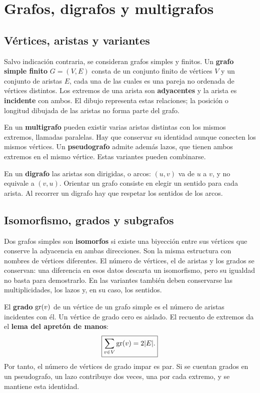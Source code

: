 \chapter{Grafos, digrafos y multigrafos}
\label{md:grafos}

\section{Vértices, aristas y variantes}

Salvo indicación contraria, se consideran grafos simples y finitos.
Un \textbf{grafo simple finito} $G=(V,E)$ consta de un conjunto finito
de vértices $V$ y un conjunto de aristas $E$, cada una de las cuales
es una pareja no ordenada de vértices distintos.
Los extremos de una arista son \textbf{adyacentes} y la arista es
\textbf{incidente} con ambos. El dibujo representa estas relaciones;
la posición o longitud dibujada de las aristas no forma parte del grafo.

En un \textbf{multigrafo} pueden existir varias aristas distintas
con los mismos extremos, llamadas paralelas. Hay que conservar
su identidad aunque conecten los mismos vértices.
Un \textbf{pseudografo} admite además lazos, que tienen ambos extremos
en el mismo vértice. Estas variantes pueden combinarse.

En un \textbf{digrafo} las aristas son dirigidas, o arcos:
$(u,v)$ va de $u$ a $v$, y no equivale a $(v,u)$.
Orientar un grafo consiste en elegir un sentido para cada arista.
Al recorrer un digrafo hay que respetar los sentidos de los arcos.

\section{Isomorfismo, grados y subgrafos}
\label{md:grados}

Dos grafos simples son \textbf{isomorfos} si existe una biyección entre
sus vértices que conserve la adyacencia en ambas direcciones.
Son la misma estructura con nombres de vértices diferentes.
El número de vértices, el de aristas y los grados se conservan:
una diferencia en esos datos descarta un isomorfismo, pero su igualdad
no basta para demostrarlo.
En las variantes también deben conservarse las multiplicidades,
los lazos y, en su caso, los sentidos.

El \textbf{grado} $\operatorname{gr}(v)$ de un vértice de un grafo simple es
el número de aristas incidentes con él. Un vértice de grado cero
es aislado. El recuento de extremos da el \textbf{lema del apretón de manos}:
\[
 \boxed{\sum_{v\in V}\operatorname{gr}(v)=2|E|.}
\]
Por tanto, el número de vértices de grado impar es par.
Si se cuentan grados en un pseudografo, un lazo contribuye dos veces,
una por cada extremo, y se mantiene esta identidad.

